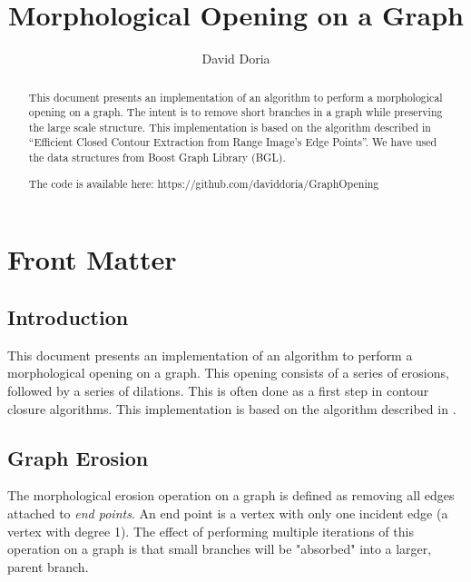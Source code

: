 \documentclass{InsightArticle}
\title{Morphological Opening on a Graph}
\author{David Doria}
\newcommand{\IJhandlerIDnumber}{3250}
\begin{document}
\IJhandlefooter{\IJhandlerIDnumber}


\ifpdf
\else
\fi


\maketitle


\ifhtml
\chapter*{Front Matter\label{front}}
\fi

\begin{abstract}
\noindent

This document presents an implementation of an algorithm to perform a morphological opening on a graph. The intent is to remove short branches in a graph while preserving the large scale structure. This implementation is based on the algorithm described in ``Efficient Closed Contour Extraction from Range Image's Edge Points''. We have used the data structures from Boost Graph Library (BGL).

The code is available here:
https://github.com/daviddoria/GraphOpening

\end{abstract}

\IJhandlenote{\IJhandlerIDnumber}

\tableofcontents
\section{Introduction}
This document presents an implementation of an algorithm to perform a morphological opening on a graph. This opening consists of a series of erosions, followed by a series of dilations. This is often done as a first step in contour closure algorithms. This implementation is based on the algorithm described in \cite{Sappa}.

\section{Graph Erosion}
The morphological erosion operation on a graph is defined as removing all edges attached to \emph{end points}. An end point is a vertex with only one incident edge (a vertex with degree 1). The effect of performing multiple iterations of this operation on a graph is that small branches will be "absorbed" into a larger, parent branch.
\end{document}
